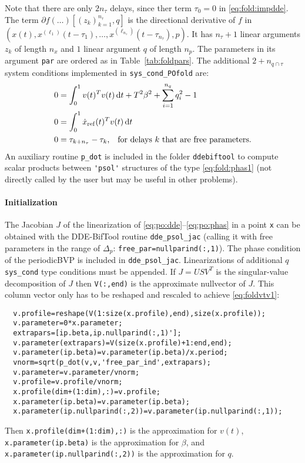 \documentclass[11pt]{scrartcl}
\renewcommand{\d}{\mathop{}\!\mathrm{d}}
\newcommand{\blist}[1]{\mbox{\lstinline!#1!}}
\begin{document}
  Note that there are only $2n_\tau$ delays, since ther term
  $\tau_0=0$ in \eqref{eq:fold:impdde}. The term
  $\partial f(\ldots)[(z_k)_{k=1}^{n_\tau},q]$ is the directional
  derivative of $f$ in
  $(x(t),x^{(\ell_1)}(t-\tau_1),\ldots,x^{(\ell_{n_\tau})}(t-\tau_{n_\tau}),p)$. It
  has $n_\tau+1$ linear arguments $z_k$ of length $n_x$ and $1$ linear
  argument $q$ of length $n_p$. The parameters in its argument \blist{par}
  are ordered as in Table~\ref{tab:foldpars}.  The additional
  $2+n_{q\cap \tau}$ system conditions implemented in
  \blist{sys_cond_POfold} are:
\begin{align}
  \label{eq:foldvtv1}
  0&=\int_0^1 v(t)^Tv(t)\d t+T^2\beta^2+\sum_{i=1}^{n_q}q_i^2-1\\
  0&=\int_0^1 \dot x_\mathrm{ref}(t)^Tv(t)\d t \label{eq:fold:phas1}\\
  0&=\tau_{k+n_\tau}-\tau_k \mbox{,\quad for delays $k$ that are free parameters.}\label{eq:fold:taurel}
\end{align}
An auxiliary routine \blist{p_dot} is included in the folder
\texttt{ddebiftool} to compute scalar products between \blist{'psol'}
structures of the type \eqref{eq:fold:phas1} (not directly called by
the user but may be useful in other problems).

\paragraph{Initialization}
The Jacobian $J$ of the linearization of
\eqref{eq:po:dde}--\eqref{eq:po:phas} in a point \blist{x} can be
obtained with the DDE-BifTool routine \blist{dde_psol_jac} (calling it
with free parameters in the range of $\Delta_p$:
\blist{free_par=nullparind(:,1)}). The phase condition of the
periodicBVP is included in \blist{dde_psol_jac}. Linearizations of
additional $q$ \blist{sys_cond} type conditions must be appended. If
$J=USV^T$ is the singular-value decomposition of $J$ then
\blist{V(:,end)} is the approximate nullvector of $J$. This column
vector only has to be reshaped and rescaled to achieve
\eqref{eq:foldvtv1}:
\begin{lstlisting}
  v.profile=reshape(V(1:size(x.profile),end),size(x.profile));
  v.parameter=0*x.parameter;
  extrapars=[ip.beta,ip.nullparind(:,1)'];
  v.parameter(extrapars)=V(size(x.profile)+1:end,end);
  v.parameter(ip.beta)=v.parameter(ip.beta)/x.period;
  vnorm=sqrt(p_dot(v,v,'free_par_ind',extrapars);
  v.parameter=v.parameter/vnorm;
  v.profile=v.profile/vnorm;
  x.profile(dim+(1:dim),:)=v.profile;
  x.parameter(ip.beta)=v.parameter(ip.beta);
  x.parameter(ip.nullparind(:,2))=v.parameter(ip.nullparind(:,1));
\end{lstlisting}
Then \blist{x.profile(dim+(1:dim),:)} is the approximation for $v(t)$,
\blist{x.parameter(ip.beta)} is the approximation for $\beta$, and
\blist{x.parameter(ip.nullparind(:,2))} is the approximation for $q$.
\end{document}
